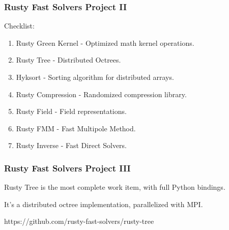 \begin{frame}
    \frametitle{Rusty Fast Solvers Project II}

    Checklist:

    \begin{enumerate}
        \item \color{green} Rusty Green Kernel  \color{black} - Optimized math kernel operations.
        \item \color{green} Rusty Tree \color{black} - Distributed Octrees.
        \item \color{green} Hyksort  \color{black} - Sorting algorithm for distributed arrays.
        \item \color{orange} Rusty Compression \color{black} - Randomized compression library.
        \item \color{orange} Rusty Field \color{black} - Field representations.
        \item \color{red} Rusty FMM \color{black} - Fast Multipole Method.
        \item \color{red} Rusty Inverse \color{black} - Fast Direct Solvers.
    \end{enumerate}

\end{frame}

\begin{frame}
    \frametitle{Rusty Fast Solvers Project III}

    Rusty Tree is the most complete work item, with full Python bindings.

    \hspace*{5pt}

    It's a distributed octree implementation, parallelized with MPI.

    \hspace*{5pt}

    https://github.com/rusty-fast-solvers/rusty-tree

\end{frame}